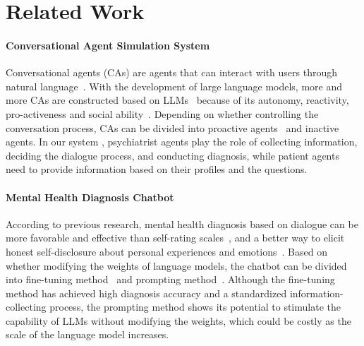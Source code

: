 \section{Related Work}
\paragraph{Conversational Agent Simulation System}
Conversational agents (CAs) are agents that can interact with users through natural language~\cite{Allouch2021ConversationalAG}. With the development of large language models, more and more CAs are constructed based on LLMs~\cite{Park2023GenerativeAgents,  chen2023llmempoweredchatbotspsychiatristpatient, shao2023characterllmtrainableagentroleplaying, li2023chatdoctormedicalchatmodel, han2024ibsendirectoractoragentcollaboration, 10.1145/3586182.3615796, jörke2024supportingphysicalactivitybehavior, yang2024simschatcustomisablepersonadrivenroleplaying} because of its autonomy, reactivity, pro-activeness and social ability~\cite{xi2023risepotentiallargelanguage}. Depending on whether controlling the conversation process, CAs can be divided into proactive agents~\cite{Liao2023ProactiveCA, Deng2023PromptingAE, Zhang2024AskbeforePlanPL, Deng2024TowardsHP, deng-etal-2023-knowledge} and inactive agents. In our system \system, psychiatrist agents play the role of collecting information, deciding the dialogue process, and conducting diagnosis, while patient agents need to provide information based on their profiles and the questions.

\paragraph{Mental Health Diagnosis Chatbot}
According to previous research, mental health diagnosis based on dialogue can be more favorable and effective than self-rating scales~\cite{Vaidyam2019ChatbotsAC, Abdalrazaq2019AnOO}, and a better way to elicit honest self-disclosure about personal experiences and emotions~\cite{Kawasaki2020AssessingUM, Duvvuri2022PredictingDS}. Based on whether modifying the weights of language models, the chatbot can be divided into fine-tuning method~\cite{yao-etal-2022-d4, gu2024enhancingdepressiondiagnosisorientedchatpsychological,Lan2024TowardsRA, Ren2024WundtGPTSL} and prompting method~\cite{chen2023llmempoweredchatbotspsychiatristpatient, Tao2023ClassifyingAA, Li2024LeveragingLL, Ferrario2024TheRO, Kumar2024MentalHC, Wang2023ChainofthoughtPF, seo2024diagescdialoguesynthesisintegrating}. Although the fine-tuning method has achieved high diagnosis accuracy and a standardized information-collecting process, the prompting method shows its potential to stimulate the capability of LLMs without modifying the weights, which could be costly as the scale of the language model increases.
